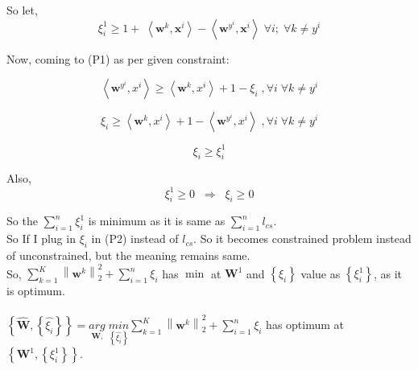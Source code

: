 \documentclass[a4paper,11pt]{article}
\begin{document}
\begin{mlsolution}
So let, 
\[ \xi_{i}^{1}  \geq  1 +  \;\left \langle \textbf{w}^{k}, \textbf{x}^{i} \right \rangle - \left \langle \textbf{w}^{y^{i}}, \textbf{x}^{i} \right \rangle\;\forall i; \;\forall k \neq y^{i}\]

Now, coming to (P1) as per given constraint:

\[
\left \langle \textbf{w}^{y^{i}}, x^{i} \right \rangle \geq \left \langle \textbf{w}^{k}, x^{i} \right \rangle + 1 - \xi_{i}\; , \forall i\; \forall k\neq y^{i}
\]

\[
\xi_{i} \geq \left \langle \textbf{w}^{k}, x^{i} \right \rangle + 1 - \left \langle \textbf{w}^{y^{i}}, x^{i} \right \rangle\; , \forall i\; \forall k\neq y^{i}
\]

\[
\xi_{i} \geq \xi_{i}^{1}
\]

Also,
\[
\xi_{i}^{1} \geq 0 \;\; \Rightarrow \;\; \xi_{i} \geq 0
\]

So the \begin{math}
\sum_{i=1}^{n} \xi_{i}^{1} 
\end{math} is minimum as it is same as \begin{math}\sum_{i=1}^{n} l_{cs}\end{math}.\\

So If I plug in \begin{math} \xi_{i} \end{math} in (P2) instead of \begin{math}
l_{cs}\end{math}. So it becomes constrained problem instead of unconstrained, but the meaning remains same.\\

So, \begin{math}
\sum_{k=1}^{K} \left \| \textbf{w}^{k} \right \|^{2}_{2} + \sum_{i=1}^{n} \xi _{i}
\end{math} has  \begin{math}
\min
\end{math} at \begin{math}\textbf{W}^{1} \end{math} and \begin{math}
\left \{\xi_{i}\right \}\end{math} value as \begin{math}\left \{ \xi_{i}^{1}\right \} \end{math}, as it is optimum.\\\\

\begin{math}
\left \{ \widehat{\textbf{W}}, \left \{ \widehat{\xi _{i}} \right \} \right \} = \underset{\textbf{W},}{arg} \; \underset{ \left \{ \widehat{\xi _{i}} \right \}}{min} \sum_{k=1}^{K} \left \| \textbf{w}^{k} \right \|^{2}_{2} + \sum_{i=1}^{n} \xi _{i}\end{math}  \;has optimum at \begin{math} \left \{ \textbf{W}^{1}, \left \{ \xi _{i}^{1} \right \} \right \} \end{math}.\\\\


\end{mlsolution}
\end{document}
